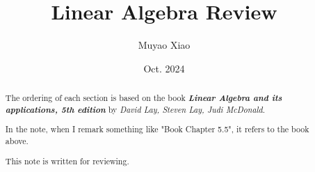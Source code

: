 \documentclass[a4paper]{report}
\title{Linear Algebra Review}
\author{Muyao Xiao}
\date{Oct. 2024}
\begin{document}
\maketitle

\begin{abstract}
    The ordering of each section is based on the book \textbf{\textit{Linear Algebra and its applications, 5th edition}} by  \textit{David Lay, Steven Lay, Judi McDonald}.
    \par 

    In the note, when I remark something like "Book Chapter 5.5", it refers to the book above.

    This note is written for reviewing.
\end{abstract}

\tableofcontents

% 
% 
% 
% 
% 

\pagestyle{plain}
\printbibliography{}
\end{document}
